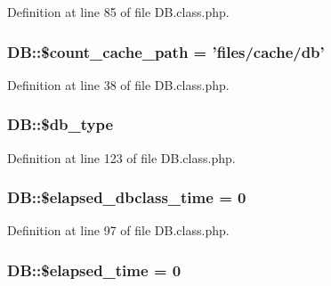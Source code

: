 Definition at line 85 of file D\-B.\-class.\-php.

\hypertarget{classDB_aca72b9b3a39bb5e5d2e444f20db2c6bb}{
\subsubsection[{\$count\-\_\-cache\-\_\-path}]{\setlength{\rightskip}{0pt plus 5cm}D\-B\-::\$count\-\_\-cache\-\_\-path = 'files/cache/db'}}\label{classDB_aca72b9b3a39bb5e5d2e444f20db2c6bb}


Definition at line 38 of file D\-B.\-class.\-php.

\hypertarget{classDB_a78868b4c2301aa813d9e2d481424f1e8}{
\subsubsection[{\$db\-\_\-type}]{\setlength{\rightskip}{0pt plus 5cm}D\-B\-::\$db\-\_\-type}}\label{classDB_a78868b4c2301aa813d9e2d481424f1e8}


Definition at line 123 of file D\-B.\-class.\-php.

\hypertarget{classDB_a0483c1bfe18fa5e8bbe7915f9c8187a7}{
\subsubsection[{\$elapsed\-\_\-dbclass\-\_\-time}]{\setlength{\rightskip}{0pt plus 5cm}D\-B\-::\$elapsed\-\_\-dbclass\-\_\-time = 0}}\label{classDB_a0483c1bfe18fa5e8bbe7915f9c8187a7}


Definition at line 97 of file D\-B.\-class.\-php.

\hypertarget{classDB_af5a3fdd4e0078a185dac8c2727fb4f2c}{
\subsubsection[{\$elapsed\-\_\-time}]{\setlength{\rightskip}{0pt plus 5cm}D\-B\-::\$elapsed\-\_\-time = 0}}\label{classDB_af5a3fdd4e0078a185dac8c2727fb4f2c}


